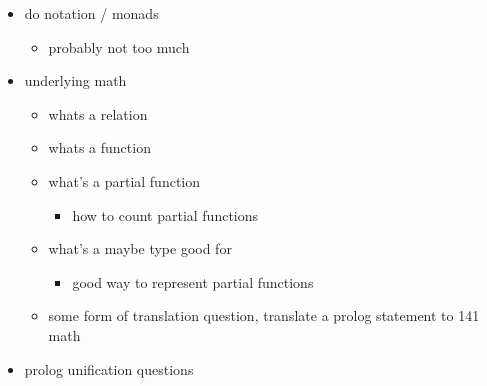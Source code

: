 \documentclass[11pt]{article}
\begin{document}
\begin{itemize}
\begin{itemize}
\begin{itemize}
\end{itemize}
\end{itemize}
\item do notation / monads
\begin{itemize}
\item probably not too much
\end{itemize}
\item underlying math
\begin{itemize}
\item whats a relation
\item whats a function
\item what's a partial function
\begin{itemize}
\item how to count partial functions
\end{itemize}
\item what's a maybe type good for
\begin{itemize}
\item good way to represent partial functions
\end{itemize}
\item some form of translation question, translate a prolog statement to 141 math
\end{itemize}
\item prolog unification questions
\end{itemize}
\end{document}
